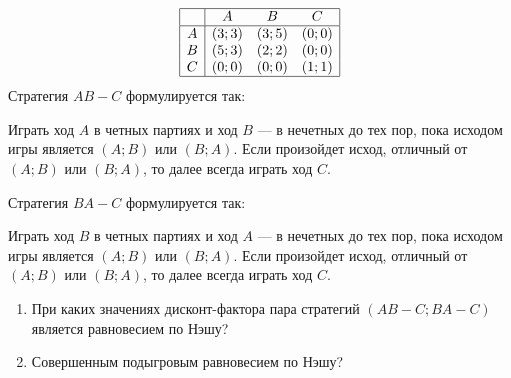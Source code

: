 \begin{problem}

\[\begin{array}{|c|ccc|}  \hline {} & {A} & {B} & {C} \\  \hline {A} & {\left(3;3\right)} & {\left(3;5\right)} & {\left(0;0\right)} \\ {B} & {\left(5;3\right)} & {\left(2;2\right)} & {\left(0;0\right)} \\ {C} & {\left(0;0\right)} & {\left(0;0\right)} & {\left(1;1\right)} \\  \hline  \end{array}\]
Стратегия  $AB-C$  формулируется так:\par
Играть ход  $A$  в четных партиях и ход  $B$  — в нечетных до тех пор, пока исходом игры является  $\left(A;B\right)$  или  $\left(B;A\right)$. Если произойдет исход, отличный от  $\left(A;B\right)$  или  $\left(B;A\right)$, то далее всегда играть ход  $C$.\par
Стратегия  $BA-C$  формулируется так:\par
Играть ход  $B$  в четных партиях и ход  $A$  — в нечетных до тех пор, пока исходом игры является  $\left(A;B\right)$  или  $\left(B;A\right)$. Если произойдет исход, отличный от  $\left(A;B\right)$  или  $\left(B;A\right)$, то далее всегда играть ход  $C$.\par
\begin{enumerate}
\item При каких значениях дисконт-фактора пара стратегий  $\left(AB-C;BA-C\right)$  является равновесием по Нэшу?\par
\item Совершенным подыгровым равновесием по Нэшу?
\end{enumerate}


\begin{sol}

\end{sol}
\end{problem}



